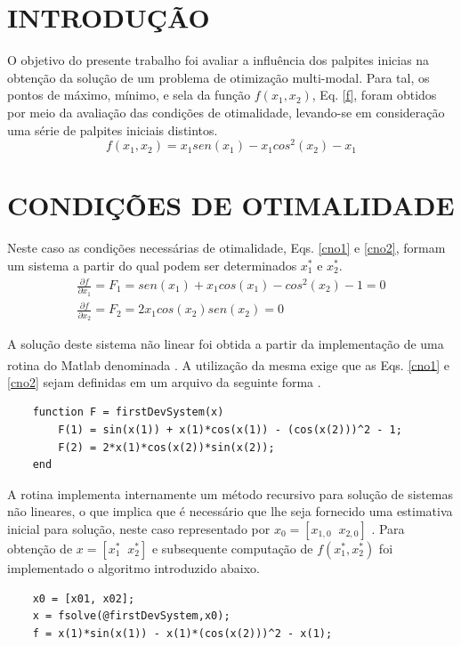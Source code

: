 \documentclass[12pt]{article}
\begin{document}
	\section{INTRODUÇÃO}
	
	O objetivo do presente trabalho foi avaliar a influência dos palpites inicias na obtenção da solução de um problema de otimização multi-modal. Para tal, os pontos de máximo, mínimo, e sela da função $ f(x_1, x_2) $, Eq. \ref{f}, foram obtidos por meio da avaliação das condições de otimalidade, levando-se em consideração uma série de palpites iniciais distintos.
	\begin{equation}
	f(x_1, x_2) = x_1 sen(x_1) - x_1 cos^2(x_2) - x_1 \label{f} 
	\end{equation}
	
	\section{CONDIÇÕES DE OTIMALIDADE}
	
	Neste caso as condições necessárias de otimalidade, Eqs. \ref{cno1} e \ref{cno2}, formam um sistema a partir do qual podem ser determinados $ x_1^* $ e $ x_2^* $.
	\begin{gather}
		\frac{\partial f}{\partial x_1} = F_1 = sen(x_1) + x_1 cos(x_1) - cos^2(x_2) - 1 = 0 \label{cno1}\\
		\frac{\partial f}{\partial x_2} = F_2 = 2 x_1 cos(x_2) sen(x_2) = 0 \label{cno2}
	\end{gather}
	
	A solução deste sistema não linear foi obtida a partir da implementação de uma rotina do Matlab\textsuperscript{\textregistered} denominada . A utilização da mesma exige que as Eqs. \ref{cno1} e \ref{cno2} sejam definidas em um arquivo  da seguinte forma \citep{fsolve}.
	
	\begin{lstlisting}
	function F = firstDevSystem(x)
		F(1) = sin(x(1)) + x(1)*cos(x(1)) - (cos(x(2)))^2 - 1;
		F(2) = 2*x(1)*cos(x(2))*sin(x(2));
	end
	\end{lstlisting}

	A rotina  implementa internamente um método recursivo para solução de sistemas não lineares, o que implica que é necessário que lhe seja fornecido uma estimativa inicial para solução, neste caso representado por $ x_0 = [x_{1,0} \;\; x_{2,0}] $ \citep{fsolve}. Para obtenção de $ x = [x_1^* \;\; x_2^*] $ e subsequente computação de $ f(x_1^*, x_2^*) $ foi implementado o algoritmo introduzido abaixo.
	\begin{lstlisting}
	x0 = [x01, x02];
	x = fsolve(@firstDevSystem,x0);
	f = x(1)*sin(x(1)) - x(1)*(cos(x(2)))^2 - x(1);
	\end{lstlisting}
	
\end{document}
